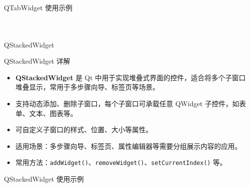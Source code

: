 \documentclass[UTF8,aspectratio=169]{beamer}
\begin{document}
\begin{frame}[fragile]{QTabWidget 使用示例}
    \begin{columns}
        \begin{column}{0.48\textwidth}
            \inputminted[firstline=1,lastline=20]{cpp}{code/qt_tabwidget_example.cpp}
        \end{column}
        \begin{column}{0.48\textwidth}
            \inputminted[firstline=21,lastline=41]{cpp}{code/qt_tabwidget_example.cpp}
        \end{column}
    \end{columns}
\end{frame}

\begin{frame}{QStackedWidget}
    \begin{ytublock}{QStackedWidget 详解}
        \begin{itemize}
            \item \textbf{QStackedWidget} 是 Qt 中用于实现堆叠式界面的控件，适合将多个子窗口堆叠显示，常用于多步骤向导、标签页等场景。
            \item 支持动态添加、删除子窗口，每个子窗口可承载任意 QWidget 子控件，如表单、文本、图表等。
            \item 可自定义子窗口的样式、位置、大小等属性。
            \item 适用场景：多步骤向导、标签页、属性编辑器等需要分组展示内容的应用。
            \item 常用方法：\texttt{addWidget()}、\texttt{removeWidget()}、\texttt{setCurrentIndex()} 等。
        \end{itemize}
    \end{ytublock}
\end{frame}

\begin{frame}[fragile]{QStackedWidget 使用示例}
    \begin{columns}
        \begin{column}{0.48\textwidth}
            \inputminted[firstline=1,lastline=19]{cpp}{code/qt_stackedwidget_example.cpp}
        \end{column}
        \begin{column}{0.48\textwidth}
            \inputminted[firstline=20,lastline=39]{cpp}{code/qt_stackedwidget_example.cpp}
        \end{column}
    \end{columns}
\end{frame}
\end{document}

